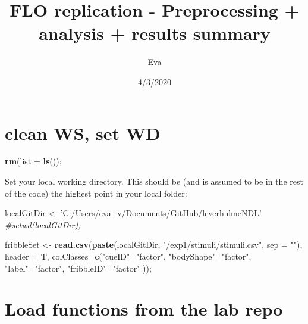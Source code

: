 \documentclass[
]{article}
\title{FLO replication - Preprocessing + analysis + results summary}
\author{Eva}
\date{4/3/2020}
\newenvironment{Shaded}{\begin{snugshade}}{\end{snugshade}}
\newcommand{\CommentTok}[1]{\textcolor[rgb]{0.56,0.35,0.01}{\textit{#1}}}
\newcommand{\DataTypeTok}[1]{\textcolor[rgb]{0.13,0.29,0.53}{#1}}
\newcommand{\KeywordTok}[1]{\textcolor[rgb]{0.13,0.29,0.53}{\textbf{#1}}}
\newcommand{\NormalTok}[1]{#1}
\newcommand{\StringTok}[1]{\textcolor[rgb]{0.31,0.60,0.02}{#1}}
\begin{document}
\maketitle

{
\setcounter{tocdepth}{3}
\tableofcontents
}
\hypertarget{clean-ws-set-wd}{%
\section{clean WS, set WD}\label{clean-ws-set-wd}}

\begin{Shaded}
\begin{Highlighting}[]
\KeywordTok{rm}\NormalTok{(}\DataTypeTok{list =} \KeywordTok{ls}\NormalTok{());}
\end{Highlighting}
\end{Shaded}

Set your local working directory. This should be (and is assumed to be
in the rest of the code) the highest point in your local folder:

\begin{Shaded}
\begin{Highlighting}[]
\NormalTok{localGitDir <-}\StringTok{ 'C:/Users/eva_v/Documents/GitHub/leverhulmeNDL'}
\CommentTok{#setwd(localGitDir);}
\end{Highlighting}
\end{Shaded}

\begin{Shaded}
\begin{Highlighting}[]
\NormalTok{fribbleSet <-}\StringTok{ }\KeywordTok{read.csv}\NormalTok{(}\KeywordTok{paste}\NormalTok{(localGitDir, }\StringTok{"/exp1/stimuli/stimuli.csv"}\NormalTok{, }\DataTypeTok{sep =} \StringTok{""}\NormalTok{), }
                       \DataTypeTok{header =}\NormalTok{ T,}
                       \DataTypeTok{colClasses=}\KeywordTok{c}\NormalTok{(}\StringTok{"cueID"}\NormalTok{=}\StringTok{"factor"}\NormalTok{,}
                        \StringTok{"bodyShape"}\NormalTok{=}\StringTok{"factor"}\NormalTok{,}
                        \StringTok{"label"}\NormalTok{=}\StringTok{"factor"}\NormalTok{,}
                        \StringTok{"fribbleID"}\NormalTok{=}\StringTok{"factor"}
\NormalTok{                        ));}
\end{Highlighting}
\end{Shaded}

\hypertarget{load-functions-from-the-lab-repo}{%
\section{Load functions from the lab
repo}\label{load-functions-from-the-lab-repo}}
\end{document}
